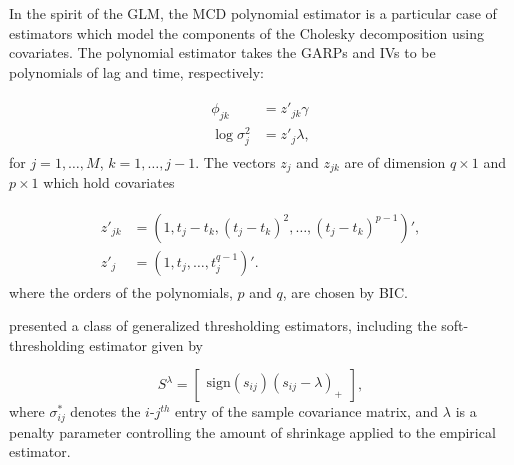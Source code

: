 \bigskip

{}

\bigskip

In the spirit of the GLM, the MCD polynomial estimator is a particular case of estimators which model the components of the Cholesky decomposition using covariates. The polynomial estimator takes the GARPs and IVs to be polynomials of lag and time, respectively:

\begin{align*}
\begin{split}  \label{eq:GARP-IV-parametric-model}
\phi_{jk} &= z'_{jk} \gamma \\
\log \sigma^2_{j} &= z'_{j}\lambda, 
\end{split}
\end{align*}
\noindent
for $j = 1,\dots, M$, $k = 1,\dots, j-1$. The vectors $z_j$ and $z_{jk}$ are of dimension $q \times 1$ and $p \times 1$  which hold covariates

\begin{align}
\begin{split} 
z'_{jk} &= \left(1, t_j - t_k, \left(t_j - t_k\right)^2,\dots, \left(t_j - t_k\right)^{p-1}\right)', \\
z'_{j}  &= \left(1, t_j, \dots, t_j^{q-1}\right)'.
\end{split}
\end{align} \label{eq:mcd-polynomial-model}
\noindent
where the orders of the polynomials, $p$ and $q$, are chosen by BIC. 

\bigskip

\cite{rothman2009generalized} presented a class of generalized thresholding estimators, including the soft-thresholding estimator given by

\[
S^{\lambda}=   \begin{bmatrix} \mbox{sign}\left(s_{ij}\right) \left(s_{ij} - \lambda\right)_+ \end{bmatrix},
\]
\noindent 
where $\sigma^*_{ij}$ denotes the $i$-$j^{th}$ entry of the sample covariance matrix, and $\lambda$ is a penalty parameter controlling the amount of shrinkage applied to the empirical estimator. 

\bigskip

